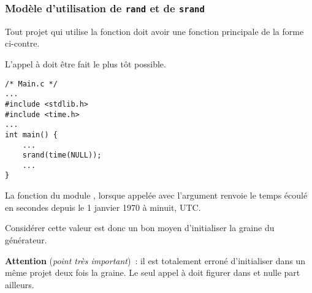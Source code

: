 \begin{frame}[fragile]
\frametitle{Modèle d'utilisation de {\tt rand} et de {\tt srand}}
\begin{multicols}{2}
Tout projet qui utilise la fonction  doit avoir une fonction
principale  de la forme ci-contre.
\smallskip

L'appel à  doit être fait le plus tôt possible.

\begin{center}
\begin{minipage}[c]{.4\textwidth}
\begin{lstlisting}[frame=single,numbers=none,basicstyle=\scriptsize\tt]
/* Main.c */
...
#include <stdlib.h>
#include <time.h>
...
int main() {
    ...
    srand(time(NULL));
    ...
}
\end{lstlisting}
\end{minipage}
\end{center}
\end{multicols}

La fonction 
du module , lorsque appelée avec l'argument 
renvoie le temps écoulé en secondes depuis le 1\ier{} janvier 1970 à
minuit, UTC.
\medskip

Considérer cette valeur est donc un bon moyen d'initialiser la graine
du générateur.
\medskip

{\bf Attention} ({\em point très important})~: il est totalement erroné
d'initialiser dans un même projet deux fois la graine. Le seul appel à
 doit figurer dans  et nulle part ailleurs.
\end{frame}

